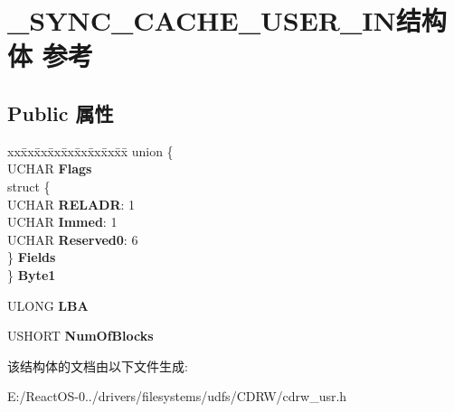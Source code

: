 \hypertarget{struct___s_y_n_c___c_a_c_h_e___u_s_e_r___i_n}{}\section{\+\_\+\+S\+Y\+N\+C\+\_\+\+C\+A\+C\+H\+E\+\_\+\+U\+S\+E\+R\+\_\+\+I\+N结构体 参考}
\label{struct___s_y_n_c___c_a_c_h_e___u_s_e_r___i_n}
\subsection*{Public 属性}
\begin{DoxyCompactItemize}
\item 
\mbox{\label{struct___s_y_n_c___c_a_c_h_e___u_s_e_r___i_n_ad32078ac58122265372fa5a2886fde6b}} 
\begin{tabbing}
xx\=xx\=xx\=xx\=xx\=xx\=xx\=xx\=xx\=\kill
union \{\\
\>UCHAR {\bfseries Flags}\\
\>struct \{\\
\>\>UCHAR {\bfseries RELADR}: 1\\
\>\>UCHAR {\bfseries Immed}: 1\\
\>\>UCHAR {\bfseries Reserved0}: 6\\
\>\} {\bfseries Fields}\\
\} {\bfseries Byte1}\\

\end{tabbing}\item 
\mbox{\label{struct___s_y_n_c___c_a_c_h_e___u_s_e_r___i_n_abbfc15548d67ec8a250d739c3693a369}} 
U\+L\+O\+NG {\bfseries L\+BA}
\item 
\mbox{\label{struct___s_y_n_c___c_a_c_h_e___u_s_e_r___i_n_a83daec058e5b89b73dcf1fd2ea7ac5a5}} 
U\+S\+H\+O\+RT {\bfseries Num\+Of\+Blocks}
\end{DoxyCompactItemize}


该结构体的文档由以下文件生成\+:\begin{DoxyCompactItemize}
\item 
E\+:/\+React\+O\+S-\/0../drivers/filesystems/udfs/\+C\+D\+R\+W/cdrw\+\_\+usr.\+h\end{DoxyCompactItemize}
